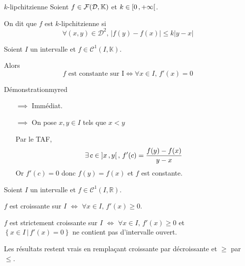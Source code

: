     \begin{defi}{$k$-lipchitzienne}{}
        Soient $f \in \mathcal{F}(\mathcal{D},\mathbb{K})$ et $k \in \left[ 0 \, , +\infty \right[$.

        On dit que $f$ est $k$-lipchitzienne si 
        \[ \forall (x,y) \in \mathcal{D}^2, \, \left| f(y)-f(x) \right| \leq k \left| y-x \right| \]
    \end{defi}

    \begin{theo}{}{}
        Soient $I$ un intervalle et $f \in \mathcal{C}^1(I,\mathbb{K})$. 
    
        Alors \[ f \text{ est constante sur I} \iff \forall x \in I, \, f'(x) = 0 \]
    \end{theo}

    \begin{demo}{Démonstration}{myred}
        \begin{itemize}
            \item[\textcolor{myred}{$\implies$}] Immédiat.
            \item[\textcolor{myred}{$\implies$}] On pose $x,y \in I$ tels que $x < y$
            
            Par le TAF, \[ \exists \, c \in \left] x \, , y \right[, \, f'(c) = \frac{f(y)-f(x)}{y-x} \] 
            Or $f'(c) = 0$ donc $f(y) = f(x)$ et $f$ est constante.
        \end{itemize} 
    \end{demo}

    \begin{theo}{}{}
        Soient $I$ un intervalle et $f \in \mathcal{C}^1(I,\mathbb{R})$.

        \begin{alors}
            \item $f$ est croissante sur $I$ $\iff$ $\forall x \in I, \, f'(x) \geq 0$.
            \item $f$ est strictement croissante sur $I$ $\iff$ $ \forall x \in I, \, f'(x) \geq 0 $ et $\left\{ x \in I \,  | \, f'(x) = 0\right\}$ ne contient pas d’intervalle ouvert.
        \end{alors}
        Les résultats restent vrais en remplaçant croissante par décroissante et $\geq$ par $\leq$.
    \end{theo}

